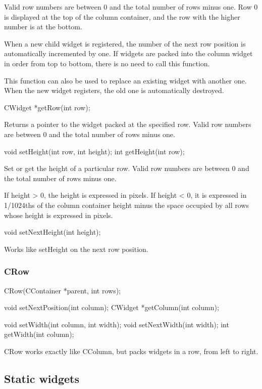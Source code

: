 \documentclass[a4paper,11pt]{journal}
\begin{document}
Valid row numbers are between 0 and the total number of rows minus one. Row 0 is displayed at the top of the column container, and the row with the higher number is at the bottom.

When a new child widget is registered, the number of the next row position is automatically incremented by one. If widgets are packed into the column widget in order from top to bottom, there is no need to call this function.

This function can also be used to replace an existing widget with another one. When the new widget registers, the old one is automatically destroyed.\\
\begin{verbatimtab}CWidget *getRow(int row);\end{verbatimtab}
Returns a pointer to the widget packed at the specified row. Valid row numbers are between 0 and the total number of rows minus one.\\
\begin{verbatimtab}
void setHeight(int row, int height);
int getHeight(int row);
\end{verbatimtab}
Set or get the height of a particular row. Valid row numbers are between 0 and the total number of rows minus one.

If height > 0, the height is expressed in pixels. If height < 0, it is expressed in 1/1024ths of the column container height minus the space occupied by all rows whose height is expressed in pixels.\\
\begin{verbatimtab}void setNextHeight(int height);\end{verbatimtab}
Works like setHeight on the next row position.

\subsubsection{CRow}
\begin{verbatimtab}
CRow(CContainer *parent, int rows);

void setNextPosition(int column);
CWidget *getColumn(int column);

void setWidth(int column, int width);
void setNextWidth(int width);
int getWidth(int column);
\end{verbatimtab}
CRow works exactly like CColumn, but packs widgets in a row, from left to right.

\subsection{Static widgets}
\end{document}
